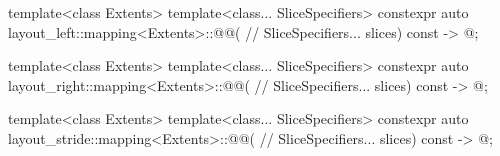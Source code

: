 %
%
%
\begin{itemdecl}
template<class Extents>
  template<class... SliceSpecifiers>
    constexpr auto layout_left::mapping<Extents>::@@(   // \expos
      SliceSpecifiers... slices) const -> @\seebelow@;

template<class Extents>
  template<class... SliceSpecifiers>
    constexpr auto layout_right::mapping<Extents>::@@(  // \expos
      SliceSpecifiers... slices) const -> @\seebelow@;

template<class Extents>
  template<class... SliceSpecifiers>
    constexpr auto layout_stride::mapping<Extents>::@@( // \expos
      SliceSpecifiers... slices) const -> @\seebelow@;
\end{itemdecl}

